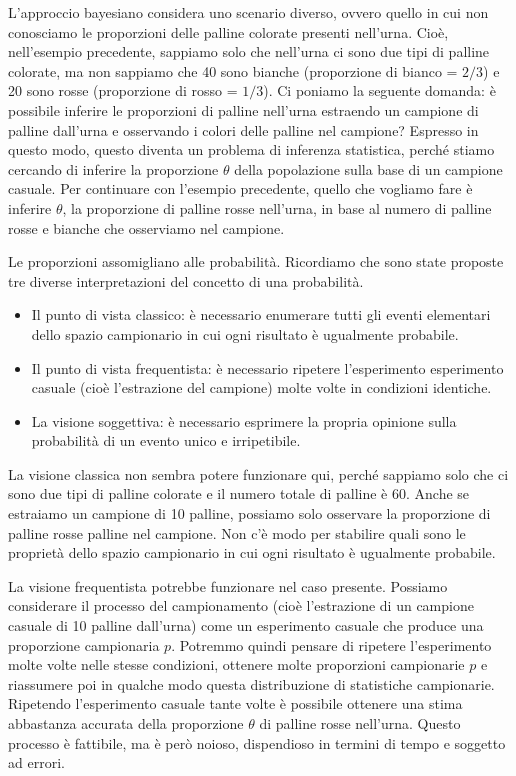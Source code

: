 \documentclass[
  11pt,
]{krantz}
\providecommand{\tightlist}{%
  \setlength{\itemsep}{0pt}\setlength{\parskip}{0pt}}
\theoremstyle{definition}
\theoremstyle{definition}
\theoremstyle{definition}
\theoremstyle{definition}
\theoremstyle{remark}
\begin{document}
L'approccio bayesiano considera uno scenario diverso, ovvero quello in cui non conosciamo le proporzioni delle palline colorate presenti nell'urna. Cioè, nell'esempio precedente, sappiamo solo che nell'urna ci sono due tipi di palline colorate, ma non sappiamo che 40 sono bianche (proporzione di bianco = \(2/3\)) e 20 sono rosse (proporzione di rosso = \(1/3\)). Ci poniamo la seguente domanda: è possibile inferire le proporzioni di palline nell'urna estraendo un campione di palline dall'urna e osservando i colori delle palline nel campione? Espresso in questo modo, questo diventa un problema di inferenza statistica, perché stiamo cercando di inferire la proporzione \(\theta\) della popolazione sulla base di un campione casuale. Per continuare con l'esempio precedente, quello che vogliamo fare è inferire \(\theta\), la proporzione di palline rosse nell'urna, in base al numero di palline rosse e bianche che osserviamo nel campione.

Le proporzioni assomigliano alle probabilità. Ricordiamo che sono state proposte tre diverse interpretazioni del concetto di una probabilità.

\begin{itemize}
\tightlist
\item
  Il punto di vista classico: è necessario enumerare tutti gli eventi elementari dello spazio campionario in cui ogni risultato è ugualmente probabile.
\item
  Il punto di vista frequentista: è necessario ripetere l'esperimento esperimento casuale (cioè l'estrazione del campione) molte volte in condizioni identiche.
\item
  La visione soggettiva: è necessario esprimere la propria opinione sulla probabilità di un evento unico e irripetibile.
\end{itemize}

La visione classica non sembra potere funzionare qui, perché sappiamo solo che ci sono due tipi di palline colorate e il numero totale di palline è 60. Anche se estraiamo un campione di 10 palline, possiamo solo osservare la proporzione di palline rosse palline nel campione. Non c'è modo per stabilire quali sono le proprietà dello spazio campionario in cui ogni risultato è ugualmente probabile.

La visione frequentista potrebbe funzionare nel caso presente. Possiamo considerare il processo del campionamento (cioè l'estrazione di un campione casuale di 10 palline dall'urna) come un esperimento casuale che produce una proporzione campionaria \(p\). Potremmo quindi pensare di ripetere l'esperimento molte volte nelle stesse condizioni, ottenere molte proporzioni campionarie \(p\) e riassumere poi in qualche modo questa distribuzione di statistiche campionarie. Ripetendo l'esperimento casuale tante volte è possibile ottenere una stima abbastanza accurata della proporzione \(\theta\) di palline rosse nell'urna. Questo processo è fattibile, ma è però noioso, dispendioso in termini di tempo e soggetto ad errori.
\end{document}
